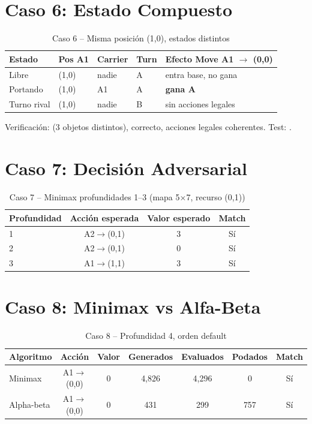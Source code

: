 \section{Caso 6: Estado Compuesto}
\label{sec:tabla-caso6}

\begin{table}[H]
\centering
\caption{Caso 6 -- Misma posición (1,0), estados distintos}
\begin{tabular}{lllll}
\toprule
Estado & Pos A1 & Carrier & Turn & Efecto Move A1 $\to$ (0,0) \\
\midrule
Libre & (1,0) & nadie & A & entra base, no gana \\
Portando & (1,0) & A1 & A & \textbf{gana A} \\
Turno rival & (1,0) & nadie & B & sin acciones legales \\
\bottomrule
\end{tabular}
\end{table}
\label{tab:caso6-full}


Verificación:  (3 objetos distintos),  correcto,
acciones legales coherentes. Test: .

\section{Caso 7: Decisión Adversarial}
\label{sec:tabla-caso7}

\begin{table}[H]
\centering
\caption{Caso 7 -- Minimax profundidades 1--3 (mapa 5$\times$7, recurso (0,1))}
\begin{tabular}{lccc}
\toprule
Profundidad & Acción esperada & Valor esperado & Match \\
\midrule
1 & A2$\to$(0,1) & 3 & Sí \\
2 & A2$\to$(0,1) & 0 & Sí \\
3 & A1$\to$(1,1) & 3 & Sí \\
\bottomrule
\end{tabular}
\end{table}
\label{tab:caso7-full}


\section{Caso 8: Minimax vs Alfa-Beta}
\label{sec:tabla-caso8}

\begin{table}[H]
\centering
\caption{Caso 8 -- Profundidad 4, orden default}
\begin{tabular}{lcccccc}
\toprule
Algoritmo & Acción & Valor & Generados & Evaluados & Podados & Match \\
\midrule
Minimax & A1$\to$(0,0) & 0 & 4,826 & 4,296 & 0 & Sí \\
Alpha-beta & A1$\to$(0,0) & 0 & 431 & 299 & 757 & Sí \\
\bottomrule
\end{tabular}
\end{table}
\label{tab:caso8-full}


